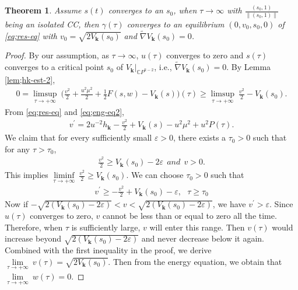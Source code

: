 \documentclass[11pt]{amsart}
\newtheorem{theorem}{Theorem}[section]
\theoremstyle{definition}
\theoremstyle{remark}
\numberwithin{equation}{section}
\newcommand{\ep}{\varepsilon}
\begin{document}
\begin{theorem}
    Assume $s(t)$ converges to an $s_0$, when $\tau \to \infty$ with $\frac{(s_0, 1)}{\| (s_0, 1)\|}$ being an isolated CC, then $\gamma(\tau)$ converges to an equilibrium $(0,v_0,s_0,0)$ of \eqref{eq;res-eq} with $v_0=\sqrt{2V_{\mathbf{k}}(s_0)}$ and $\tilde{\nabla}V_{\mathbf{k}}(s_0)=0$.  
\end{theorem}
\begin{proof}
    By our assumption, as $\tau \to \infty$, $u(\tau)$ converges to zero and $s(\tau)$ converges to a critical point $s_0$ of $V_{\mathbf{k}}|_{\mathbb{C}P^{k-2}}$, i.e., $\tilde{\nabla}V_{\mathbf{k}}(s_0)=0$. By Lemma \ref{lem;hk-est-2}, 
    \begin{align*}
        0=\underset{\tau\rightarrow+\infty}{\limsup}\ \Big(\frac{v^2}{2}+\frac{u^2\mu^2}{2}+\frac{1}{2}F(s,w)-V_{\mathbf{k}}(s)\Big)(\tau)\ge\underset{\tau\rightarrow+\infty}{\limsup}\ \frac{v^2}{2}-V_{\mathbf{k}}(s_0).
    \end{align*}
   From \eqref{eq;res-eq} and \eqref{eq;eng-eq2},  
   \begin{align*}
       v^\prime=2u^{-2}h_{\mathbf{k}}-\frac{v^2}{2}+V_{\mathbf{k}}(s)-u^2\mu^2+u^2P(\tau).
   \end{align*}
   We claim that for every sufficiently small $\ep>0$, there exists a $\tau_0>0$ such that for any $\tau > \tau_0$, 
    \begin{align*}
        \frac{v^2}{2}\ge V_{\mathbf{k}}(s_0)-2\ep\ \ and\ \ v>0.
    \end{align*}
    This implies $\underset{\tau\rightarrow+\infty}{\liminf}\ \frac{v^2}{2}\ge V_{\mathbf{k}}(s_0)$. We can choose $\tau_0>0$ such that
   \begin{align*}
       v^\prime\ge -\frac{v^2}{2}+V_{\mathbf{k}}(s_0)-\ep,\ \ \ \tau\ge\tau_0
   \end{align*}
   Now if $-\sqrt{2(V_{\mathbf{k}}(s_0)-2\ep)}<v<\sqrt{2(V_{\mathbf{k}}(s_0)-2\ep)}$, we have $v^\prime>\ep$. Since $u(\tau)$ converges to zero, $v$ cannot be less than or equal to zero all the time. Therefore, when $\tau$ is sufficiently large, $v$ will enter this range. Then $v(\tau)$ would increase beyond $\sqrt{2(V_{\mathbf{k}}(s_0)-2\ep)}$ and never decrease below it again. Combined with the first inequality in the proof, we derive $\underset{\tau\rightarrow+\infty}{\lim}\ v(\tau)=\sqrt{2V_{\mathbf{k}}(s_0)}$. Then from the energy equation, we obtain that $\underset{\tau\rightarrow+\infty}{\lim}\ w(\tau)=0$.
\end{proof}
\end{document}
